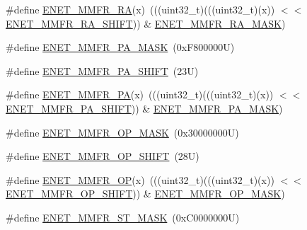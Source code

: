\begin{DoxyCompactItemize}
\item 
\#define \mbox{\hyperlink{group___e_n_e_t___register___masks_ga8279a64d4827ed6f212bb99f7904bc13}{E\+N\+E\+T\+\_\+\+M\+M\+F\+R\+\_\+\+RA}}(x)~(((uint32\+\_\+t)(((uint32\+\_\+t)(x)) $<$$<$ \mbox{\hyperlink{group___e_n_e_t___register___masks_gacb92c97e6dc7b0e466141a7f7cb63f4d}{E\+N\+E\+T\+\_\+\+M\+M\+F\+R\+\_\+\+R\+A\+\_\+\+S\+H\+I\+FT}})) \& \mbox{\hyperlink{group___e_n_e_t___register___masks_ga3325bdb05d05a8ec384202a6537a7f9f}{E\+N\+E\+T\+\_\+\+M\+M\+F\+R\+\_\+\+R\+A\+\_\+\+M\+A\+SK}})
\item 
\#define \mbox{\hyperlink{group___e_n_e_t___register___masks_ga94bdc2ca69bff166783ef7c044c025b4}{E\+N\+E\+T\+\_\+\+M\+M\+F\+R\+\_\+\+P\+A\+\_\+\+M\+A\+SK}}~(0x\+F800000\+U)
\item 
\#define \mbox{\hyperlink{group___e_n_e_t___register___masks_gaf0551254f9579ac5acce7a3d8d22d808}{E\+N\+E\+T\+\_\+\+M\+M\+F\+R\+\_\+\+P\+A\+\_\+\+S\+H\+I\+FT}}~(23\+U)
\item 
\#define \mbox{\hyperlink{group___e_n_e_t___register___masks_gabc1d7007e1d9cee9e24f31a8c289f375}{E\+N\+E\+T\+\_\+\+M\+M\+F\+R\+\_\+\+PA}}(x)~(((uint32\+\_\+t)(((uint32\+\_\+t)(x)) $<$$<$ \mbox{\hyperlink{group___e_n_e_t___register___masks_gaf0551254f9579ac5acce7a3d8d22d808}{E\+N\+E\+T\+\_\+\+M\+M\+F\+R\+\_\+\+P\+A\+\_\+\+S\+H\+I\+FT}})) \& \mbox{\hyperlink{group___e_n_e_t___register___masks_ga94bdc2ca69bff166783ef7c044c025b4}{E\+N\+E\+T\+\_\+\+M\+M\+F\+R\+\_\+\+P\+A\+\_\+\+M\+A\+SK}})
\item 
\#define \mbox{\hyperlink{group___e_n_e_t___register___masks_ga90049372c88bf3a759aecb3b9ab7208d}{E\+N\+E\+T\+\_\+\+M\+M\+F\+R\+\_\+\+O\+P\+\_\+\+M\+A\+SK}}~(0x30000000\+U)
\item 
\#define \mbox{\hyperlink{group___e_n_e_t___register___masks_ga6c7887926bc9935d7fd783894fb4a34c}{E\+N\+E\+T\+\_\+\+M\+M\+F\+R\+\_\+\+O\+P\+\_\+\+S\+H\+I\+FT}}~(28\+U)
\item 
\#define \mbox{\hyperlink{group___e_n_e_t___register___masks_gac00d5a828e48d9012aacde18087a622c}{E\+N\+E\+T\+\_\+\+M\+M\+F\+R\+\_\+\+OP}}(x)~(((uint32\+\_\+t)(((uint32\+\_\+t)(x)) $<$$<$ \mbox{\hyperlink{group___e_n_e_t___register___masks_ga6c7887926bc9935d7fd783894fb4a34c}{E\+N\+E\+T\+\_\+\+M\+M\+F\+R\+\_\+\+O\+P\+\_\+\+S\+H\+I\+FT}})) \& \mbox{\hyperlink{group___e_n_e_t___register___masks_ga90049372c88bf3a759aecb3b9ab7208d}{E\+N\+E\+T\+\_\+\+M\+M\+F\+R\+\_\+\+O\+P\+\_\+\+M\+A\+SK}})
\item 
\#define \mbox{\hyperlink{group___e_n_e_t___register___masks_ga98ea3eee6cc1ad4be4cd471b4adfd876}{E\+N\+E\+T\+\_\+\+M\+M\+F\+R\+\_\+\+S\+T\+\_\+\+M\+A\+SK}}~(0x\+C0000000\+U)
$$
\end{DoxyCompactItemize}
